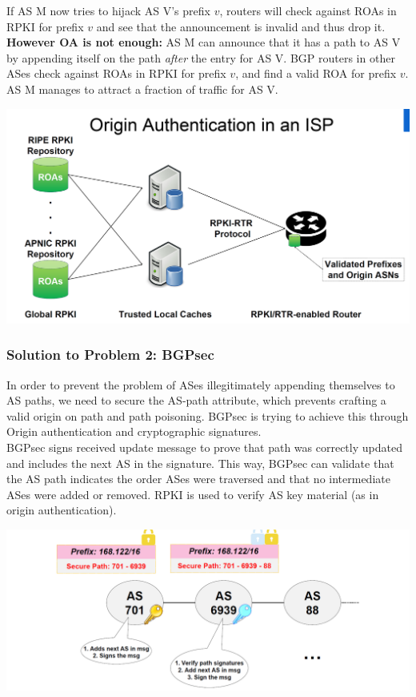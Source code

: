 If AS M now tries to hijack AS V's prefix $v$, routers will check against ROAs in RPKI for prefix $v$ and see that the announcement is invalid and thus drop it.\\
\textbf{However OA is not enough:} AS M can announce that it has a path to AS V by appending itself on the path \textit{after} the entry for AS V. BGP routers in other ASes check against ROAs in RPKI for prefix $v$, and find a valid ROA for prefix $v$. AS M manages to attract a fraction of traffic for AS V.

\begin{minipage}{\linewidth}
    \centering      
    \includegraphics[width=\linewidth]{Figures/BGP_oa.PNG} 
\end{minipage}

\subsubsection{Solution to Problem 2: BGPsec}

In order to prevent the problem of ASes illegitimately appending themselves to AS paths, we need to secure the AS-path attribute, which prevents crafting a valid origin on path and path poisoning. BGPsec is trying to achieve this through Origin authentication and cryptographic signatures.\\
BGPsec signs received update message to prove that path was correctly updated and includes the next AS in the signature. This way, BGPsec can validate that the AS path indicates the order ASes were traversed and that no intermediate ASes were added or removed. RPKI is used to verify AS key material (as in origin authentication).\\

\begin{minipage}{\linewidth}
    \centering      
    \includegraphics[width=\linewidth]{Figures/BGP_bgpsec.PNG} 
\end{minipage}

